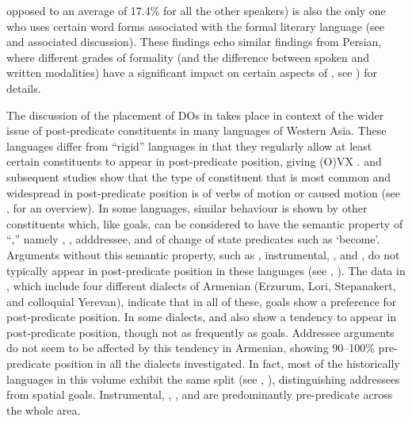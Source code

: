 \documentclass[output=paper,colorlinks,citecolor=brown,draftmode]{langscibook}
\begin{document}
opposed to an average of 17.4\%  for all the other speakers) is also the only one who uses certain word forms associated with the formal literary language (see  and associated discussion). These findings echo similar findings from Persian, where different grades of formality (and the difference between spoken and written modalities) have a significant impact on certain aspects of , see ) for details.

The discussion of the placement of DOs in \citet{stilo_preverbal_2018} takes place in context of the wider issue of post-predicate constituents in many  languages of Western Asia. These languages differ from ``rigid''  languages in that they regularly allow at least certain constituents to appear in post-predicate position, giving (O)VX . \citet{stilo_preverbal_2018} and subsequent studies show that the type of constituent that is most common and widespread in post-predicate position is  of verbs of motion or caused motion (see , for an overview). In some languages, similar behaviour is shown by other constituents which, like goals, can be considered to have the semantic property of ``,'' namely , , adddressee, and  of change of state predicates such as `become'. Arguments without this semantic property, such as , instrumental, , and , do not typically appear in post-predicate position in these languages (see \citealt{haig_introduction_2018}, \citealt{stilo_preverbal_2018}). The data in \citet{stilo_preverbal_2018}, which include four different dialects of Armenian (Erzurum, Lori, Stepanakert, and colloquial Yerevan), indicate that in all of these, goals show a preference for post-predicate position. In some dialects,  and  also show a tendency to appear in post-predicate position, though not as frequently as goals. Addressee arguments do not seem to be affected by this tendency in Armenian, showing 90--100\% pre-predicate position in all the dialects investigated. In fact, most of the historically  languages in this volume exhibit the same split (see ,  ), distinguishing addressees from spatial goals. Instrumental, , , and  are predominantly pre-predicate across the whole area.
\end{document}
